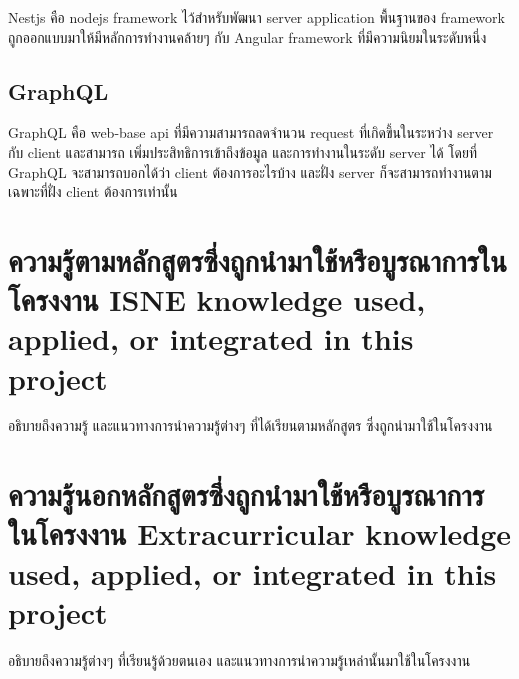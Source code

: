 Nestjs \cite{nestjs} คือ nodejs \cite{nodejs} framework \cite{framework} ไว้สำหรับพัฒนา server application \cite {serverapplication} พื้นฐานของ framework ถูกออกแบบมาให้มีหลักการทำงานคล้ายๆ กับ Angular framework \cite{angular} ที่มีความนิยมในระดับหนึ่ง

\subsection{GraphQL}

GraphQL \cite{graphql} คือ web-base api \cite{webapi} ที่มีความสามารถลดจำนวน request ที่เกิดขึ้นในระหว่าง server กับ client และสามารถ เพิ่มประสิทธิการเข้าถึงข้อมูล และการทำงานในระดับ server ได้ โดยที่ GraphQL จะสามารถบอกได้ว่า client ต้องการอะไรบ้าง และฝั่ง server ก็จะสามารถทำงานตามเฉพาะที่ฝั่ง client ต้องการเท่านั้น

\section{\ifcpe%
ความรู้ตามหลักสูตรซึ่งถูกนำมาใช้หรือบูรณาการในโครงงาน
\else%
ISNE knowledge used, applied, or integrated in this project
\fi
}

อธิบายถึงความรู้ และแนวทางการนำความรู้ต่างๆ ที่ได้เรียนตามหลักสูตร ซึ่งถูกนำมาใช้ในโครงงาน

\section{\ifcpe%
ความรู้นอกหลักสูตรซึ่งถูกนำมาใช้หรือบูรณาการในโครงงาน
\else%
Extracurricular knowledge used, applied, or integrated in this project
\fi
}

อธิบายถึงความรู้ต่างๆ ที่เรียนรู้ด้วยตนเอง และแนวทางการนำความรู้เหล่านั้นมาใช้ในโครงงาน
